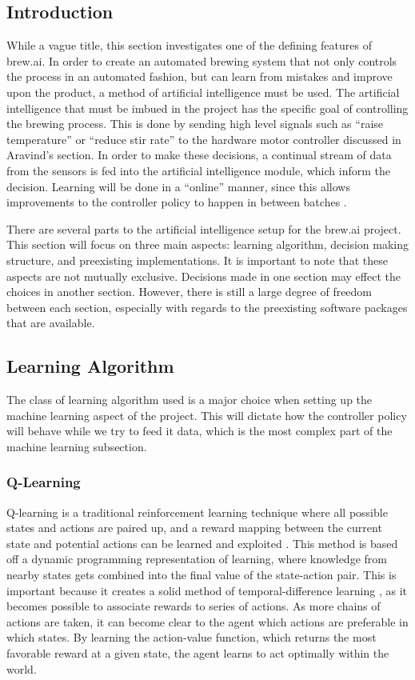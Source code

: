 \subsection{Introduction}
While a vague title, this section investigates one of the defining features of brew.ai.
In order to create an automated brewing system that not only controls the process in an automated fashion, but can learn from mistakes and improve upon the product, a method of artificial intelligence must be used.
The artificial intelligence that must be imbued in the project has the specific goal of controlling the brewing process.
This is done by sending high level signals such as ``raise temperature'' or ``reduce stir rate'' to the hardware motor controller discussed in Aravind's section.
In order to make these decisions, a continual stream of data from the sensors is fed into the artificial intelligence module, which inform the decision.
Learning will be done in a ``online'' manner, since this allows improvements to the controller policy to happen in between batches \cite{RussellNorvig}.

There are several parts to the artificial intelligence setup for the brew.ai project.
This section will focus on three main aspects: learning algorithm, decision making structure, and preexisting implementations.
It is important to note that these aspects are not mutually exclusive. 
Decisions made in one section may effect the choices in another section.
However, there is still a large degree of freedom between each section, especially with regards to the preexisting software packages that are available.

\subsection{Learning Algorithm}
The class of learning algorithm used is a major choice when setting up the machine learning aspect of the project.
This will dictate how the controller policy will behave while we try to feed it data, which is the most complex part of the machine learning subsection.
\subsubsection{Q-Learning}
Q-learning is a traditional reinforcement learning technique where all possible states and actions are paired up, and a reward mapping between the current state and potential actions can be learned and exploited \cite{SuttonBarto}.
This method is based off a dynamic programming representation of learning, where knowledge from nearby states gets combined into the final value of the state-action pair.
This is important because it creates a solid method of temporal-difference learning \cite{SuttonBarto}, as it becomes possible to associate rewards to series of actions.
As more chains of actions are taken, it can become clear to the agent which actions are preferable in which states.
By learning the action-value function, which returns the most favorable reward at a given state, the agent learns to act optimally within the world.
